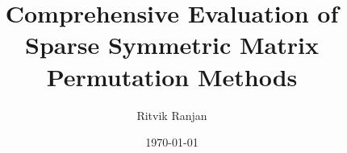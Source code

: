 \documentclass[]{iisreport}
\title{Comprehensive Evaluation of Sparse Symmetric Matrix Permutation Methods}
\author{Ritvik Ranjan}
\date{\today}
\begin{document}
\frontmatter





\tableofcontents

\mainmatter








\appendix

% 

\backmatter


 

\listoffigures
\listoftables
\listofalgorithms


\end{document}
